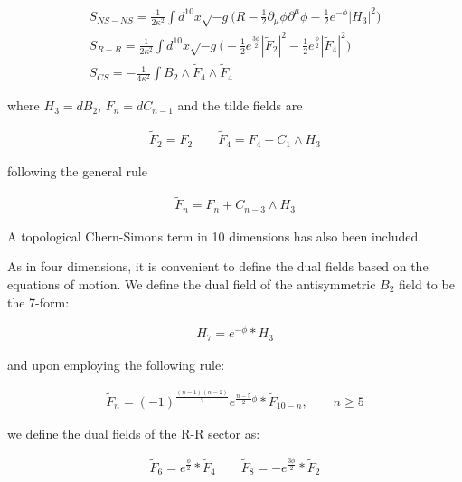 \documentclass[a4paper,notitlepage]{report}
\begin{document}
\begin{gather}
S_{NS-NS} = \frac{1}{2\kappa^{2}} \int d^{10}x \sqrt{-g} \Big(R - \frac{1}{2} \partial_{\mu} \phi \partial^{\mu} \phi - \frac{1}{2} e^{-\phi} {|H_{3}|}^2 \Big) \label{4.2} \\
S_{R-R} = \frac{1}{2\kappa^{2}} \int d^{10}x \sqrt{-g} \Big( - \frac{1}{2} e^{\frac{3\phi}{2}} {|\tilde{F}_{2}|}^2 - \frac{1}{2} e^{\frac{\phi}{2}} {|\tilde{F}_{4}|}^2 \Big) \label{4.3}\\
S_{CS} = - \frac{1}{4\kappa^{2}} \int B_{2} \wedge \tilde{F}_{4} \wedge \tilde{F}_{4} \label{4.4}
\end{gather}

\vspace{0.5em}
where $H_{3} = dB_{2}$, $F_{n} = dC_{n-1}$ and the tilde fields are

\begin{align} \label{4.5}
\tilde{F}_{2} = F_{2} \qquad \tilde{F}_{4} = F_{4} + C_{1} \wedge H_{3} 
\end{align}

\vspace{0.5em}
following the general rule

\begin{align} \label{4.6}
\tilde{F}_{n} = F_{n} + C_{n-3} \wedge H_{3} 
\end{align}

\vspace{0.5em}
A topological Chern-Simons term in 10 dimensions has also been included.

As in four dimensions, it is convenient to define the dual fields based on the equations of motion. We define the dual field of the antisymmetric $B_{2}$ field to be the 7-form:

\begin{align} \label{4.7}
{H}_7 = e^{-\phi} * {H}_3
\end{align}

and upon employing the following rule:

\vspace{0.5em}
\begin{align} \label{4.8}
{\tilde{F}}_n = {(-1)}^{\frac{(n-1)(n-2)}{2}} e^{\frac{n-5}{2}\phi} * {\tilde{F}}_{10-n}, \qquad n\geq5
\end{align}

\vspace{0.5em}
we define the dual fields of the R-R sector as:

\begin{align} \label{4.9}
{\tilde{F}}_6 = e^{\frac{\phi}{2}} * \tilde{F}_4 \qquad {\tilde{F}}_8 = - e^{\frac{3\phi}{2}} * \tilde{F}_2 
\end{align}
\end{document}
